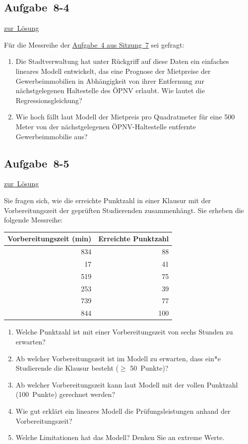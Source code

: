 \documentclass[
  11pt,
  ngerman,
  a4paper,
]{report}
\begin{document}
\hypertarget{aufgabe-8-4}{%
\subsection{Aufgabe~8-4}\label{aufgabe-8-4}}

\protect\hyperlink{loesung-8-4}{zur~Lösung}

Für die Messreihe der \protect\hyperlink{aufgabe-7-4}{Aufgabe~4 aus Sitzung~7} sei gefragt:

\begin{enumerate}
\def\labelenumi{\alph{enumi})}
\item
  Die Stadtverwaltung hat unter Rückgriff auf diese Daten ein einfaches lineares Modell entwickelt, das eine Prognose der Mietpreise der Gewerbeimmobilien in Abhängigkeit von ihrer Entfernung zur nächstgelegenen Haltestelle des ÖPNV erlaubt. Wie lautet die Regressionsgleichung?
\item
  Wie hoch fällt laut Modell der Mietpreis pro Quadratmeter für eine 500 Meter von der nächstgelegenen ÖPNV-Haltestelle entfernte Gewerbeimmobilie aus?
\end{enumerate}

\hypertarget{aufgabe-8-5}{%
\subsection{Aufgabe~8-5}\label{aufgabe-8-5}}

\protect\hyperlink{loesung-8-5}{zur~Lösung}

Sie fragen sich, wie die erreichte Punktzahl in einer Klausur mit der Vorbereitungszeit der geprüften Studierenden zusammenhängt. Sie erheben die folgende Messreihe:

\begin{table}[H]
\centering
\begin{tabular}{rr}
\toprule
\textbf{Vorbereitungszeit (min)} & \textbf{Erreichte Punktzahl}\\
\midrule
834 & 88\\
17 & 41\\
519 & 75\\
253 & 39\\
739 & 77\\
844 & 100\\
\bottomrule
\end{tabular}
\end{table}

\begin{enumerate}
\def\labelenumi{\alph{enumi})}
\item
  Welche Punktzahl ist mit einer Vorbereitungszeit von sechs Stunden zu erwarten?
\item
  Ab welcher Vorbereitungszeit ist im Modell zu erwarten, dass ein*e Studierende die Klausur besteht (\(\geq\) 50~Punkte)?
\item
  Ab welcher Vorbereitungszeit kann laut Modell mit der vollen Punktzahl (100~Punkte) gerechnet werden?
\item
  Wie gut erklärt ein lineares Modell die Prüfungsleistungen anhand der Vorbereitungszeit?
\item
  Welche Limitationen hat das Modell? Denken Sie an extreme Werte.
\end{enumerate}
\end{document}
